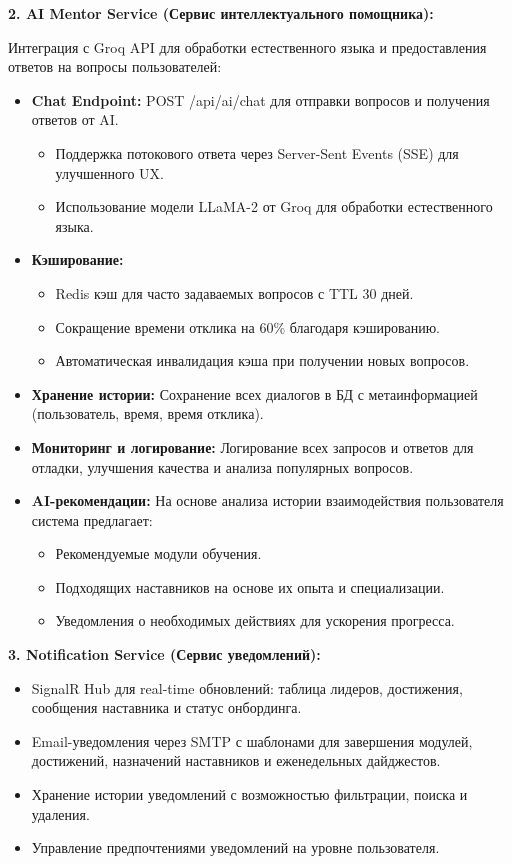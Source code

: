\textbf{2. AI Mentor Service (Сервис интеллектуального помощника):}

Интеграция с Groq API для обработки естественного языка и предоставления ответов на вопросы пользователей:
\begin{itemize}
	\item \textbf{Chat Endpoint:} POST /api/ai/chat для отправки вопросов и получения ответов от AI.
	\begin{itemize}
		\item Поддержка потокового ответа через Server-Sent Events (SSE) для улучшенного UX.
		\item Использование модели LLaMA-2 от Groq для обработки естественного языка.
	\end{itemize}
	
	\item \textbf{Кэширование:}
	\begin{itemize}
		\item Redis кэш для часто задаваемых вопросов с TTL 30 дней.
		\item Сокращение времени отклика на 60\% благодаря кэшированию.
		\item Автоматическая инвалидация кэша при получении новых вопросов.
	\end{itemize}
	
	\item \textbf{Хранение истории:} Сохранение всех диалогов в БД с метаинформацией (пользователь, время, время отклика).
	
	\item \textbf{Мониторинг и логирование:} Логирование всех запросов и ответов для отладки, улучшения качества и анализа популярных вопросов.
	
	\item \textbf{AI-рекомендации:} На основе анализа истории взаимодействия пользователя система предлагает:
	\begin{itemize}
		\item Рекомендуемые модули обучения.
		\item Подходящих наставников на основе их опыта и специализации.
		\item Уведомления о необходимых действиях для ускорения прогресса.
	\end{itemize}
\end{itemize}

\textbf{3. Notification Service (Сервис уведомлений):}
\begin{itemize}
	\item SignalR Hub для real-time обновлений: таблица лидеров, достижения, сообщения наставника и статус онбординга.
	\item Email-уведомления через SMTP с шаблонами для завершения модулей, достижений, назначений наставников и еженедельных дайджестов.
	\item Хранение истории уведомлений с возможностью фильтрации, поиска и удаления.
	\item Управление предпочтениями уведомлений на уровне пользователя.
\end{itemize}


